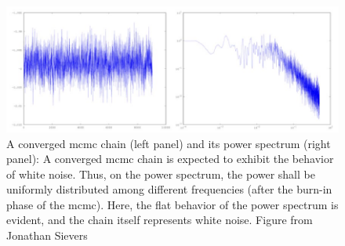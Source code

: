\documentclass[12pt, TexShade, letterpaper]{report}
\begin{document}
\begin{figure}[h!]
\centering
\includegraphics[scale =0.9]{mcmc_converged.jpg}
\caption[A converged \gls{mcmc} chain and its power spectrum]{A converged \gls{mcmc} chain (left panel) and its power spectrum (right panel): A converged \gls{mcmc} chain is expected to exhibit the behavior of white noise. Thus, on the power spectrum, the power shall be uniformly distributed among different frequencies (after the burn-in phase of the \gls{mcmc}). Here, the flat behavior of the power spectrum is evident, and the chain itself represents white noise. Figure from Jonathan Sievers \cite{mcmc_convergence_plot}}
\label{fig:MCMC_converged}
\end{figure}

\end{document}

